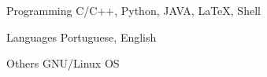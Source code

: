 

\begin{cvskills}

  \cvskill
    {Programming} %
    {C/C++, Python, JAVA, LaTeX, Shell} %


  \cvskill
    {Languages} %
    {Portuguese, English} %


  \cvskill
    {Others} %
    {GNU/Linux OS} %

\end{cvskills}
